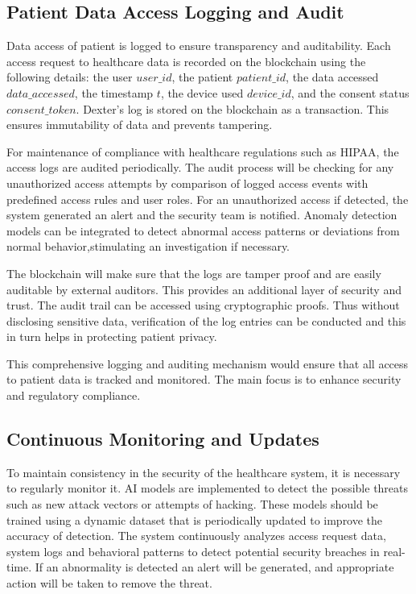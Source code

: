 \documentclass[pdflatex,sn-mathphys-num]{sn-jnl}%
\theoremstyle{thmstyleone}%
\theoremstyle{thmstyletwo}%
\theoremstyle{thmstylethree}%
\begin{document}
\subsection{Patient Data Access Logging and Audit}
Data access of patient is logged to ensure transparency and auditability\cite{bib22}. Each access request to healthcare data is recorded on the blockchain using the following details: the user \( user\_id \), the patient \( patient\_id \), the data accessed \( data\_accessed \), the timestamp \( t \), the device used \( device\_id \), and the consent status \( consent\_token \). Dexter's log is stored on the blockchain as a transaction. This ensures immutability of data and prevents tampering.

For maintenance of compliance with healthcare regulations such as HIPAA, the access logs are audited periodically. The audit process will be checking for any unauthorized access attempts by comparison of logged access events with predefined access rules and user roles. For an unauthorized access if detected, the system generated an alert and the security team is notified. Anomaly detection models can be integrated to detect abnormal access patterns or deviations from normal behavior,stimulating an investigation if necessary.


The blockchain will make sure that the logs are tamper proof and are easily auditable by external auditors. This provides an additional layer of security and trust. The audit trail can be accessed using cryptographic proofs. Thus without disclosing sensitive data, verification of the log entries can be conducted and this in turn helps in protecting patient privacy.

This comprehensive logging and auditing mechanism would ensure that all access to patient data is tracked and monitored. The main focus is to enhance security and regulatory compliance.





\subsection{Continuous Monitoring and Updates}
To maintain consistency in the security of the healthcare system, it is necessary to regularly monitor it. AI models are implemented to detect the possible threats such as new attack vectors or attempts of hacking\cite{bib23}. These models should be trained using a dynamic dataset that is periodically updated to improve the accuracy of detection. The system continuously analyzes access request data, system logs and behavioral patterns to detect potential security breaches in real-time. If an abnormality is detected an alert will be generated, and appropriate action will be taken to remove the threat.
\end{document}
